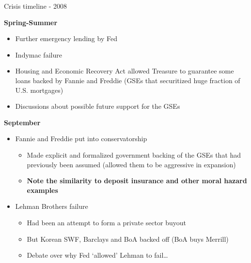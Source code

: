 
\begin{frame}{Crisis timeline - 2008}

\textbf{Spring-Summer}
	\begin{itemize}
	\item	Further emergency lending by Fed
	\item	Indymac failure
	\item	Housing and Economic Recovery Act allowed Treasure to guarantee some loans backed by Fannie and Freddie (GSEs that securitized huge fraction of U.S. mortgages)
	\item	Discussions about possible future support for the GSEs
	\end{itemize}

\textbf{September}
	\begin{itemize}
	\item	Fannie and Freddie put into conservatorship
		\begin{itemize}
		\item	Made explicit and formalized government backing of the GSEs that had previously been assumed (allowed them to be aggressive in expansion)
		\item	\textbf{Note the similarity to deposit insurance and other moral hazard examples}
		\end{itemize}
	\item	Lehman Brothers failure
		\begin{itemize}
		\item	Had been an attempt to form a private sector buyout
		\item	But Korean SWF, Barclays and BoA backed off (BoA buys Merrill)
		\item	Debate over why Fed `allowed' Lehman to fail\ldots
		\end{itemize}
	\end{itemize}

\end{frame}



